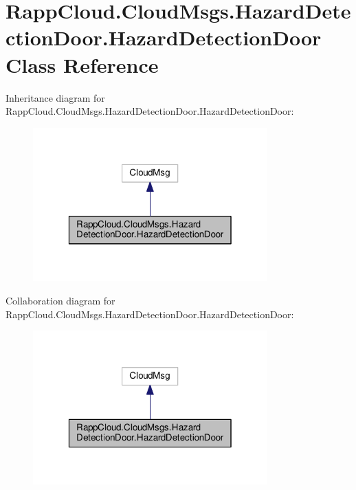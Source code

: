 \hypertarget{classRappCloud_1_1CloudMsgs_1_1HazardDetectionDoor_1_1HazardDetectionDoor}{\section{Rapp\-Cloud.\-Cloud\-Msgs.\-Hazard\-Detection\-Door.\-Hazard\-Detection\-Door Class Reference}
\label{classRappCloud_1_1CloudMsgs_1_1HazardDetectionDoor_1_1HazardDetectionDoor}
}


Inheritance diagram for Rapp\-Cloud.\-Cloud\-Msgs.\-Hazard\-Detection\-Door.\-Hazard\-Detection\-Door\-:
\nopagebreak
\begin{figure}[H]
\begin{center}
\leavevmode
\includegraphics[width=256pt]{classRappCloud_1_1CloudMsgs_1_1HazardDetectionDoor_1_1HazardDetectionDoor__inherit__graph}
\end{center}
\end{figure}


Collaboration diagram for Rapp\-Cloud.\-Cloud\-Msgs.\-Hazard\-Detection\-Door.\-Hazard\-Detection\-Door\-:
\nopagebreak
\begin{figure}[H]
\begin{center}
\leavevmode
\includegraphics[width=256pt]{classRappCloud_1_1CloudMsgs_1_1HazardDetectionDoor_1_1HazardDetectionDoor__coll__graph}
\end{center}
\end{figure}
